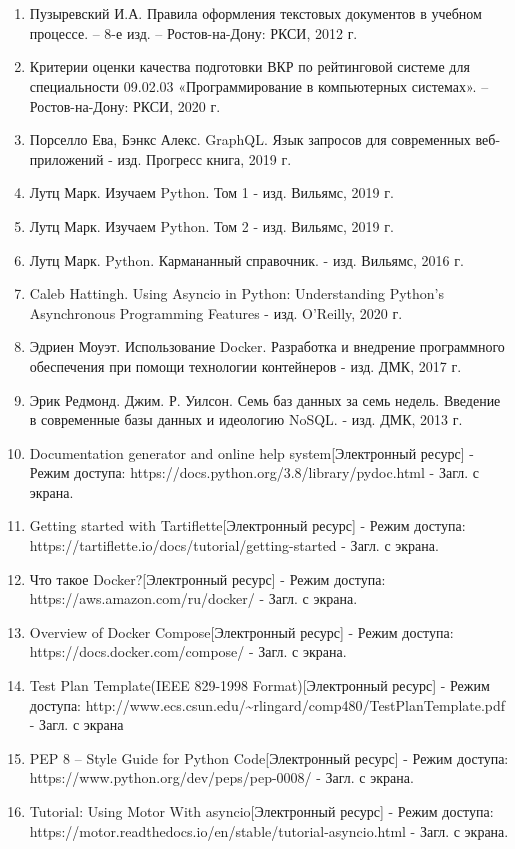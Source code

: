 \section*{}

\begin{enumerate}[label=\arabic*]
    \item Пузыревский И.А. Правила оформления текстовых документов в учебном процессе. ­– 8-е изд. – Ростов-на-Дону: РКСИ, 2012 г.
    \item Критерии оценки качества подготовки ВКР по рейтинговой системе для специальности 09.02.03 «Программирование в компьютерных системах». – Ростов-на-Дону: РКСИ, 2020 г.
    \item Порселло Ева, Бэнкс Алекс. GraphQL. Язык запросов для современных веб-приложений - изд. Прогресс книга, 2019 г.
    \item Лутц Марк. Изучаем Python. Том 1 - изд. Вильямс, 2019 г.
    \item Лутц Марк. Изучаем Python. Том 2 - изд. Вильямс, 2019 г.
    \item Лутц Марк. Python. Кармананный справочник. - изд. Вильямс, 2016 г.
    \item Caleb Hattingh. Using Asyncio in Python: Understanding Python's Asynchronous Programming Features - изд. O'Reilly, 2020 г.
    \item Эдриен Моуэт. Использование Docker. Разработка и внедрение программного обеспечения при помощи технологии контейнеров - изд. ДМК, 2017 г.
    \item Эрик Редмонд. Джим. Р. Уилсон. Семь баз данных за семь недель. Введение в современные базы данных и идеологию NoSQL. - изд. ДМК, 2013 г.
    \item Documentation generator and online help system[Электронный ресурс] - Режим доступа: https://docs.python.org/3.8/library/pydoc.html - Загл. с экрана.
    \item Getting started with Tartiflette[Электронный ресурс] - Режим доступа: https://tartiflette.io/docs/tutorial/getting-started - Загл. с экрана.
    \item Что такое Docker?[Электронный ресурс] - Режим доступа: https://aws.amazon.com/ru/docker/ - Загл. с экрана.
    \item Overview of Docker Compose[Электронный ресурс] - Режим доступа: https://docs.docker.com/compose/ - Загл. с экрана.
    \item Test Plan Template(IEEE 829-1998 Format)[Электронный ресурс] - Режим доступа: http://www.ecs.csun.edu/\~{}rlingard/comp480/TestPlanTemplate.pdf - Загл. с экрана
    \item PEP 8 -- Style Guide for Python Code[Электронный ресурс] - Режим доступа: https://www.python.org/dev/peps/pep-0008/ - Загл. с экрана.
    \item Tutorial: Using Motor With asyncio[Электронный ресурс] - Режим доступа: https://motor.readthedocs.io/en/stable/tutorial-asyncio.html - Загл. с экрана.
\end{enumerate}
